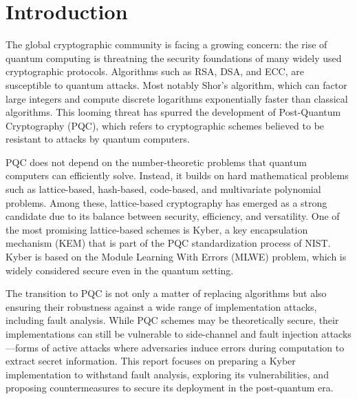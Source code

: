

\section{Introduction}
The global cryptographic community is facing a growing concern: the rise of quantum computing is threatning the security foundations of many widely used cryptographic protocols. Algorithms such as RSA, DSA, and ECC, are susceptible to quantum attacks. Most notably Shor’s algorithm, which can factor large integers and compute discrete logarithms exponentially faster than classical algorithms. This looming threat has spurred the development of Post-Quantum Cryptography (PQC), which refers to cryptographic schemes believed to be resistant to attacks by quantum computers.

PQC does not depend on the number-theoretic problems that quantum computers can efficiently solve. Instead, it builds on hard mathematical problems such as lattice-based, hash-based, code-based, and multivariate polynomial problems. Among these, lattice-based cryptography has emerged as a strong candidate due to its balance between security, efficiency, and versatility. One of the most promising lattice-based schemes is Kyber, a key encapsulation mechanism (KEM) that is part of the  PQC standardization process of NIST. Kyber is based on the Module Learning With Errors (MLWE) problem, which is widely considered secure even in the quantum setting.

The transition to PQC is not only a matter of replacing algorithms but also ensuring their robustness against a wide range of implementation attacks, including fault analysis. While PQC schemes may be theoretically secure, their implementations can still be vulnerable to side-channel and fault injection attacks—forms of active attacks where adversaries induce errors during computation to extract secret information. This report focuses on preparing a Kyber implementation to withstand fault analysis, exploring its vulnerabilities, and proposing countermeasures to secure its deployment in the post-quantum era.

